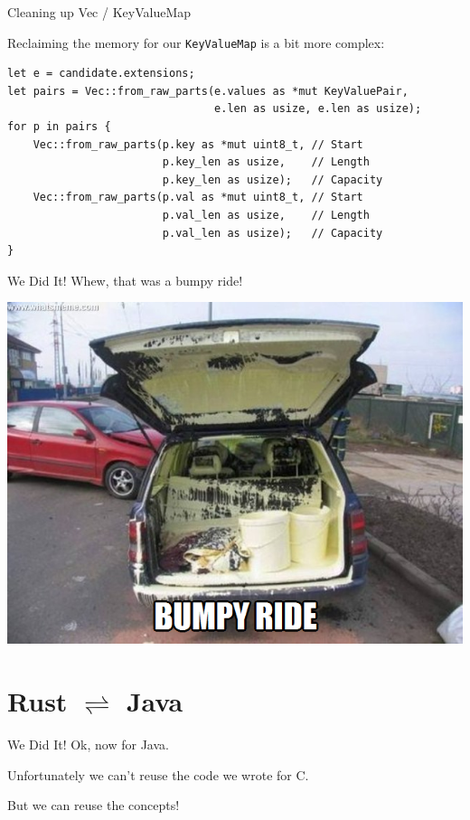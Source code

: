 \documentclass[aspectratio=1610,14pt,t]{beamer}
\begin{document}
\begin{frame}[c,fragile]{Cleaning up Vec / KeyValueMap}

  Reclaiming the memory for our \texttt{KeyValueMap} is a bit more complex:

  \begin{verbatim}
let e = candidate.extensions;
let pairs = Vec::from_raw_parts(e.values as *mut KeyValuePair,
                                e.len as usize, e.len as usize);
for p in pairs {
    Vec::from_raw_parts(p.key as *mut uint8_t, // Start
                        p.key_len as usize,    // Length
                        p.key_len as usize);   // Capacity
    Vec::from_raw_parts(p.val as *mut uint8_t, // Start
                        p.val_len as usize,    // Length
                        p.val_len as usize);   // Capacity
}
  \end{verbatim}
\end{frame}

\begin{frame}[c]{We Did It!}
  \centering
  Whew, that was a bumpy ride!

  \includegraphics[width=.6\textwidth]{img/bump.png}
\end{frame}


\section{Rust $\rightleftharpoons$ Java}

\begin{frame}[c]{We Did It!}
  Ok, now for Java.

  Unfortunately we can't reuse the code we wrote for C.

  But we can reuse the concepts!
\end{frame}
\end{document}
